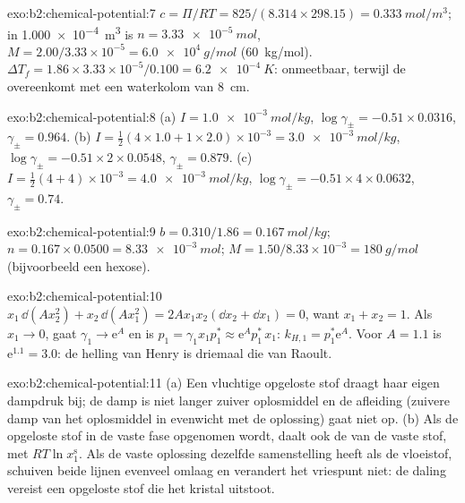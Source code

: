 \begin{solution}{exo:b2:chemical-potential:7}
$c = \Pi/RT = 825/(8.314 \times 298.15) = \qty{0.333}{mol/m^3}$; in
\qty{1.000e-4}{m^3} is $n = \qty{3.33e-5}{mol}$, $M = 2.00/3.33 \times 10^{-5}
= \qty{6.0e4}{g/mol}$ (\qty{60}{kg/mol}). $\Delta T_f = 1.86 \times 3.33
\times 10^{-5}/0.100 = \qty{6.2e-4}{K}$: onmeetbaar, terwijl de  overeenkomt met een waterkolom van \qty{8}{cm}.
\end{solution}

\begin{solution}{exo:b2:chemical-potential:8}
(a) $I = \qty{1.0e-3}{mol/kg}$, $\log\gamma_\pm = -0.51 \times 0.0316$,
$\gamma_\pm = 0.964$. (b) $I = \frac12(4 \times 1.0 + 1 \times 2.0) \times
10^{-3} = \qty{3.0e-3}{mol/kg}$, $\log\gamma_\pm = -0.51 \times 2 \times 0.0548$,
$\gamma_\pm = 0.879$. (c) $I = \frac12(4 + 4) \times 10^{-3} = \qty{4.0e-3}{mol/kg}$,
$\log\gamma_\pm = -0.51 \times 4 \times 0.0632$, $\gamma_\pm = 0.74$.
\end{solution}

\begin{solution}{exo:b2:chemical-potential:9}
$b = 0.310/1.86 = \qty{0.167}{mol/kg}$; $n = 0.167 \times 0.0500 =
\qty{8.33e-3}{mol}$; $M = 1.50/8.33 \times 10^{-3} = \qty{180}{g/mol}$
(bijvoorbeeld een hexose).
\end{solution}

\begin{solution}{exo:b2:chemical-potential:10}
$x_1\,\dd(Ax_2^2) + x_2\,\dd(Ax_1^2) = 2Ax_1x_2(\dd x_2 + \dd x_1) = 0$, want
$x_1 + x_2 = 1$. Als $x_1 \to 0$, gaat $\gamma_1 \to \mathrm e^{A}$ en is $p_1 =
\gamma_1x_1p_1^* \approx \mathrm e^{A}p_1^*\,x_1$: $k_{H,1} = p_1^*\mathrm e^A$.
Voor $A = 1.1$ is $\mathrm e^{1.1} = 3.0$: de helling van Henry is driemaal die van Raoult.
\end{solution}

\begin{solution}{exo:b2:chemical-potential:11}
(a) Een vluchtige opgeloste stof draagt haar eigen dampdruk bij; de damp is niet
langer zuiver oplosmiddel en de afleiding (zuivere damp van het oplosmiddel in
evenwicht met de oplossing) gaat niet op. (b) Als de opgeloste stof in de vaste fase opgenomen wordt, daalt
ook de  van de vaste stof, met $RT\ln x_1^{\text{s}}$. Als de
vaste oplossing dezelfde samenstelling heeft als de vloeistof, schuiven beide lijnen
evenveel omlaag en verandert het vriespunt niet: de daling
vereist een opgeloste stof die het kristal uitstoot.
\end{solution}

